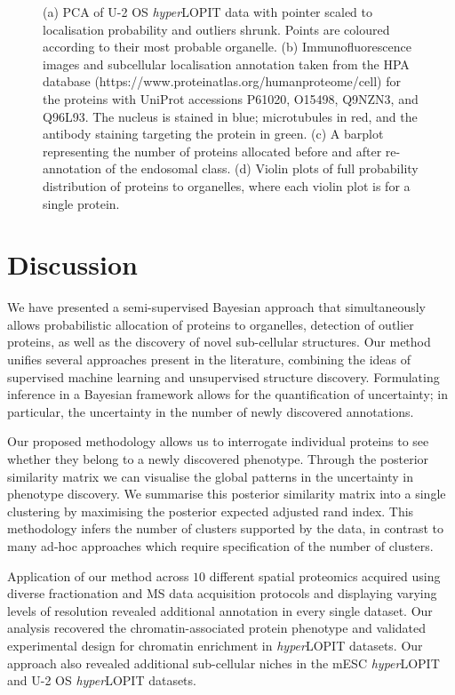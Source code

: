 \documentclass[12pt,english]{article}
\begin{document}
\begin{figure}[h]
\begin{subfigure}[t]{1\textwidth}
		\caption{}
	\end{subfigure}
	\caption{(a) PCA of U-2 OS \textit{hyper}LOPIT data with pointer scaled to localisation probability and outliers shrunk. Points are coloured according to their most probable organelle. (b) Immunofluorescence images and subcellular localisation annotation taken from the HPA database (https://www.proteinatlas.org/humanproteome/cell) for the proteins with UniProt accessions P61020, O15498, Q9NZN3, and Q96L93. The nucleus is stained in blue; microtubules in red, and the antibody staining targeting the protein in green. (c) A barplot representing the number of proteins allocated before and after re-annotation of the endosomal class. (d) Violin plots of full probability distribution of proteins to organelles, where each violin plot is for a single protein.
	}
	\label{figure:u2os}
\end{figure}
\clearpage 
\section{Discussion}
We have presented a semi-supervised Bayesian approach that simultaneously allows probabilistic allocation of proteins to organelles, detection of outlier proteins, as well as the discovery of novel sub-cellular structures. Our method unifies several approaches present in the literature, combining the ideas of supervised machine learning and unsupervised structure discovery. Formulating inference in a Bayesian framework allows for the quantification of uncertainty; in particular, the uncertainty in the number of newly discovered annotations.

Our proposed methodology allows us to interrogate individual proteins to see whether they belong to a newly discovered phenotype. Through the posterior similarity matrix we can visualise the global patterns in the uncertainty in phenotype discovery. We summarise this posterior similarity matrix into a single clustering by maximising the posterior expected adjusted rand index. This methodology infers the number of clusters supported by the data, in contrast to many ad-hoc approaches which require specification of the number of clusters.

Application of our method across $10$ different spatial proteomics acquired using diverse fractionation and MS data acquisition protocols and displaying varying levels of resolution revealed additional annotation in every single dataset. Our analysis recovered the chromatin-associated protein phenotype and validated experimental design for chromatin enrichment in \textit{hyper}LOPIT datasets. Our approach also revealed additional sub-cellular niches in the mESC \textit{hyper}LOPIT and U-2 OS \textit{hyper}LOPIT datasets.
\end{document}
